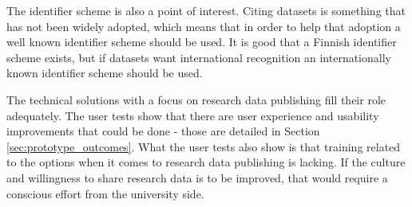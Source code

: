 The identifier scheme is also a point of interest. Citing datasets is something
that has not been widely adopted, which means that in order to help that
adoption a well known identifier scheme should be used. It is good that
a Finnish identifier scheme exists, but if datasets want international recognition
an internationally known identifier scheme should be used.

The technical solutions with a focus on research data publishing fill their
role adequately. The user tests show that there are user experience and
usability improvements that could be done - those are detailed in Section
\ref{sec:prototype_outcomes}. What the user tests also show is that training
related to the options when it comes to research data publishing is lacking.
If the culture and willingness to share research data is to be improved,
that would require a conscious effort from the university side.

